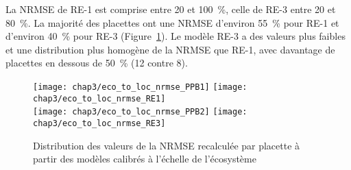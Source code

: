 La NRMSE de RE-1 est comprise entre 20 et \SI{100}{\percent}, celle de RE-3 entre 20 et \SI{80}{\percent}.
La majorité des placettes ont une NRMSE d'environ \SI{55}{\percent} pour RE-1 et d'environ \SI{40}{\percent} pour RE-3 (Figure~\ref{fig:repr_loc}).
Le modèle RE-3 a des valeurs plus faibles et une distribution plus homogène de la NRMSE que RE-1, avec davantage de placettes en dessous de \SI{50}{\percent} (12 contre 8).

\begin{figure}
\centering
\texttt{[image: chap3/eco\_to\_loc\_nrmse\_PPB1]}
\texttt{[image: chap3/eco\_to\_loc\_nrmse\_RE1]}\\
\texttt{[image: chap3/eco\_to\_loc\_nrmse\_PPB2]}
\texttt{[image: chap3/eco\_to\_loc\_nrmse\_RE3]}
\caption{Distribution des valeurs de la NRMSE recalculée par placette à partir des modèles calibrés à l'échelle de l'écosystème}
\label{fig:repr_loc}
\end{figure}







